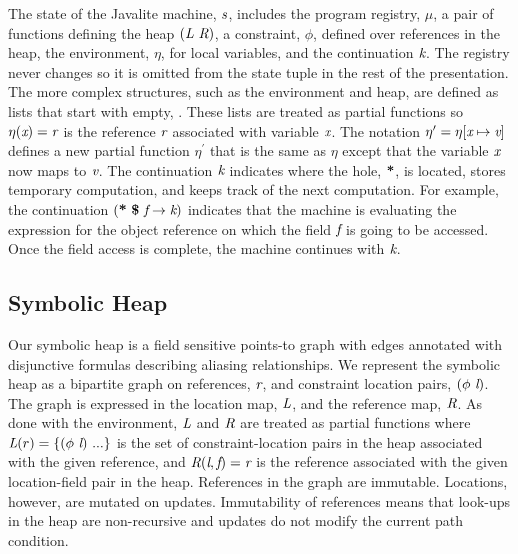 The state of the Javalite machine,
$\emph{s}$, includes the program registry, $\mu$, a pair of functions defining the heap
$(\emph{L}\ \emph{R})$, a constraint,
$\phi$, defined over references in the heap, the environment, $\eta$,
for local variables, and the continuation $\emph{k}$. The registry never changes so it is omitted from the state tuple in the rest of the presentation.  The more
complex structures, such as the environment and heap, are defined as lists that
start with empty, . These lists are treated as partial functions so
$\eta(\emph{x}) = \emph{r}$ is the reference $\emph{r}$ associated with variable
$\emph{x}$. The notation $\eta^\prime = \eta[\emph{x} \mapsto
  \emph{v}]$ defines a new partial function $\eta^\prime$ that is
the same as $\eta$ except that the variable $\emph{x}$ now maps to
$\emph{v}$. The continuation $\emph{k}$ indicates where the hole, $\textbf{*}$, is located, stores temporary computation, and keeps track of the next 
computation. For example, the continuation
$\lp\cfgt{*}\ \cfgt{\$}\ \cfgnt{f} \rightarrow \cfgnt{k}\rp$ indicates
that the machine is evaluating the expression for the object
reference on which the field $\emph{f}$ is going to be accessed. Once
the field access is complete, the machine continues with $\emph{k}$.

\subsection{Symbolic Heap}

Our symbolic heap is a field sensitive points-to graph with edges
annotated with disjunctive formulas describing aliasing
relationships. We represent the symbolic heap as a bipartite graph on
references, $\emph{r}$, and constraint location pairs,
$(\phi\ \emph{l})$. The graph is expressed in the location map,
$\emph{L}$, and the reference map, $\emph{R}$. As done with the
environment, $\emph{L}$ and $\emph{R}$ are treated as partial
functions where $\cfgnt{L}(r) = \{(\phi\ \cfgnt{l})\ ...\}$ is the set
of constraint-location pairs in the heap associated with the given
reference, and $\emph{R}(\emph{l},\emph{f}) = \emph{r}$ is the
reference associated with the given location-field pair in the
heap. References in the graph are immutable. Locations, however, are
mutated on updates.  Immutability of references means that look-ups in
the heap are non-recursive and updates do not modify the current path
condition.

